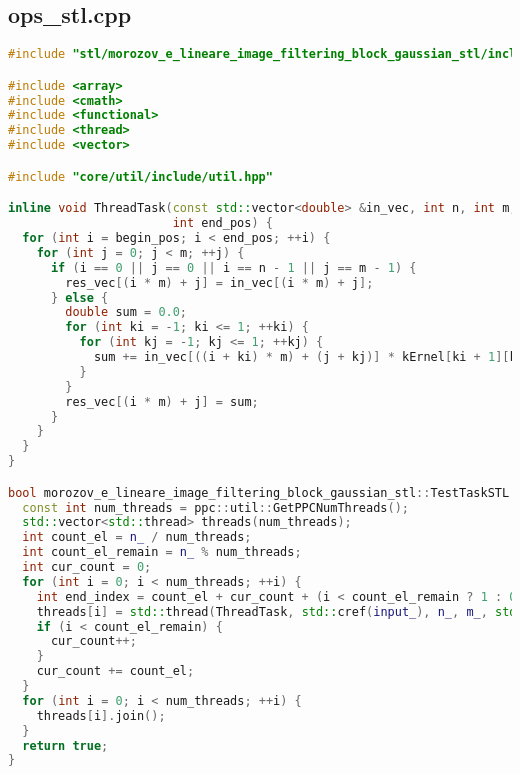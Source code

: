 \documentclass[a4paper,12pt]{article}
\begin{document}
\subsection{ops\_stl.cpp}
\begin{lstlisting}[language=C++]
#include "stl/morozov_e_lineare_image_filtering_block_gaussian_stl/include/ops_stl.hpp"

#include <array>
#include <cmath>
#include <functional>
#include <thread>
#include <vector>

#include "core/util/include/util.hpp"

inline void ThreadTask(const std::vector<double> &in_vec, int n, int m, std::vector<double> &res_vec, int begin_pos,
                       int end_pos) {
  for (int i = begin_pos; i < end_pos; ++i) {
    for (int j = 0; j < m; ++j) {
      if (i == 0 || j == 0 || i == n - 1 || j == m - 1) {
        res_vec[(i * m) + j] = in_vec[(i * m) + j];
      } else {
        double sum = 0.0;
        for (int ki = -1; ki <= 1; ++ki) {
          for (int kj = -1; kj <= 1; ++kj) {
            sum += in_vec[((i + ki) * m) + (j + kj)] * kErnel[ki + 1][kj + 1];
          }
        }
        res_vec[(i * m) + j] = sum;
      }
    }
  }
}

bool morozov_e_lineare_image_filtering_block_gaussian_stl::TestTaskSTL::RunImpl() {
  const int num_threads = ppc::util::GetPPCNumThreads();
  std::vector<std::thread> threads(num_threads);
  int count_el = n_ / num_threads;
  int count_el_remain = n_ % num_threads;
  int cur_count = 0;
  for (int i = 0; i < num_threads; ++i) {
    int end_index = count_el + cur_count + (i < count_el_remain ? 1 : 0);
    threads[i] = std::thread(ThreadTask, std::cref(input_), n_, m_, std::ref(res_), cur_count, end_index);
    if (i < count_el_remain) {
      cur_count++;
    }
    cur_count += count_el;
  }
  for (int i = 0; i < num_threads; ++i) {
    threads[i].join();
  }
  return true;
}
\end{lstlisting}
\end{document}
